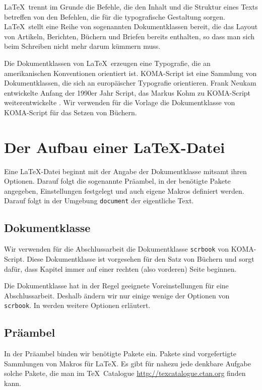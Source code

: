 \LaTeX\ trennt im Grunde die Befehle, die den Inhalt und die Struktur
eines Texts betreffen von den Befehlen, die für die typografische
Gestaltung sorgen.  \LaTeX\ stellt eine Reihe von sogenannten
Dokumentklassen bereit, die das Layout von Artikeln, Berichten, Büchern
und Briefen bereits enthalten, so dass man sich beim Schreiben nicht
mehr darum kümmern muss.

Die Dokumentklassen von \LaTeX\ erzeugen eine Typografie, die an
amerikanischen Konventionen orientiert ist. \textsf{KOMA-Script} ist eine
Sammlung von Dokumentklassen, die sich an europäischer Typografie
orientieren. Frank Neukam entwickelte Anfang der 1990er Jahr
\textsf{Script}, das Markus Kohm zu \textsf{KOMA-Script}
weiterentwickelte \cite{koma16}. Wir verwenden für die Vorlage die
Dokumentklasse von \textsf{KOMA-Script} für das Setzen von Büchern.


\section{Der Aufbau einer \LaTeX-Datei}
\label{sec:aufbau}

Eine \LaTeX-Datei beginnt mit der Angabe der Dokumentklasse mitsamt
ihren Optionen. Darauf folgt die sogenannte Präambel, in der benötigte
Pakete angegeben, Einstellungen festgelegt und auch eigene Makros
definiert werden. Darauf folgt in der Umgebung \verb=document= der
eigentliche Text.

\subsection{Dokumentklasse}

Wir verwenden für die Abschlussarbeit die Dokumentklasse \verb=scrbook=
von \textsf{KOMA-Script}. Diese Dokumentklasse ist vorgesehen für den
Satz von Büchern und sorgt dafür, dass Kapitel immer auf einer rechten
(also vorderen) Seite beginnen.

Die Dokumentklasse hat in der Regel geeignete Voreinstellungen für eine
Abschlussarbeit. Deshalb ändern wir nur einige wenige der Optionen von
\verb=scrbook=. In \cite{partosch15} werden weitere Optionen erläutert.

\subsection{Präambel}

In der Präambel binden wir benötigte Pakete ein. Pakete sind
vorgefertigte Sammlungen von Makros für \LaTeX. Es gibt für nahezu jede
denkbare Aufgabe solche Pakete, die man im \TeX\ Catalogue
\url{http://texcatalogue.ctan.org} finden kann.

